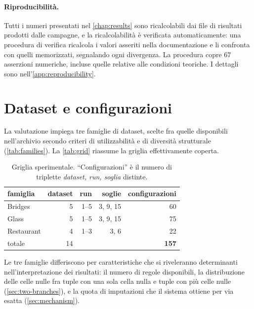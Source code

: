 \paragraph{Riproducibilità.}\label{sec:reproducibility}
Tutti i numeri presentati nel \autoref{chap:results} sono ricalcolabili dai file di risultati
prodotti dalle campagne, e la ricalcolabilità è verificata automaticamente: una procedura di
verifica ricalcola i valori asseriti nella documentazione e li confronta con quelli memorizzati,
segnalando ogni divergenza. La procedura copre \num{67} asserzioni numeriche, incluse quelle
relative alle condizioni teoriche. I dettagli sono nell'\autoref{app:reproducibility}.

\section{Dataset e configurazioni}\label{sec:datasets-exp}

La valutazione impiega tre famiglie di dataset, scelte fra quelle disponibili nell'archivio
secondo criteri di utilizzabilità e di diversità strutturale
(\autoref{tab:families}). La \autoref{tab:grid} riassume la griglia effettivamente coperta.

\begin{table}[htbp]
\centering
\caption{Griglia sperimentale. ``Configurazioni'' è il numero di triplette
\emph{dataset, run, soglia} distinte.}
\label{tab:grid}
\footnotesize
\begin{tabular}{lrrrr}
\toprule
famiglia & dataset & run & soglie & configurazioni \\
\midrule
Bridges    & 5 & 1--5 & 3, 9, 15 & 60 \\
Glass      & 5 & 1--5 & 3, 9, 15 & 75 \\
Restaurant & 4 & 1--3 & 3, 6     & 22 \\
\midrule
totale     & 14 & & & \textbf{157} \\
\bottomrule
\end{tabular}
\end{table}

Le tre famiglie differiscono per caratteristiche che si riveleranno determinanti
nell'interpretazione dei risultati: il numero di regole disponibili, la distribuzione delle celle
nulle fra tuple con una sola cella nulla e tuple con più celle nulle
(\autoref{sec:two-branches}), e la quota di imputazioni che il sistema ottiene per via esatta
(\autoref{sec:mechanism}).

